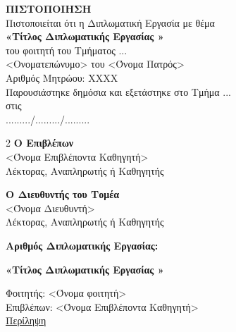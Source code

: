 \begin{center}
	\clearpage\thispagestyle{empty} %
    \vspace*{2cm}
    {\Large\textbf{ΠΙΣΤΟΠΟΙΗΣΗ}}\\[1cm]
    \large
    Πιστοποιείται ότι η Διπλωματική Εργασία με θέμα\\[1cm]
    \textbf{«Τίτλος Διπλωματικής Εργασίας »}\\[1cm]
	του φοιτητή του Τμήματος ...\\
	
	<Ονοματεπώνυμο> του <Όνομα Πατρός>\\[0.8cm]
	Αριθμός Μητρώου: ΧΧΧΧ\\[1.5cm]
	Παρουσιάστηκε δημόσια και εξετάστηκε στο Τμήμα ...\\
	στις\\
	........./........./.........\\[8cm]

	\raggedcolumns
	\begin{multicols}{2}
			\textbf{ Ο Επιβλέπων}\\[1cm]
			 	<Όνομα Επιβλέποντα Καθηγητή>\\
				Λέκτορας, Αναπληρωτής ή Καθηγητής
	\columnbreak

		\textbf{Ο Διευθυντής του Τομέα}\\[1cm]
			<Όνομα Διευθυντή>\\
			Λέκτορας, Αναπληρωτής ή Καθηγητής
	
	\end{multicols}
	\pagebreak\thispagestyle{empty}
\end{center}
\afterpage{\null\newpage}



\clearpage\thispagestyle{empty}
\large
{}
{}
\vspace*{1.5cm}
\hspace{0.2cm}\textbf{Αριθμός Διπλωματικής Εργασίας:}\\
\begin{center}
    \textbf{«Τίτλος Διπλωματικής Εργασίας »}\\[0.8cm]
\end{center}
Φοιτητής: <Όνομα φοιτητή>\\[0.8cm]
Επιβλέπων: <Όνομα Επιβλέποντα Καθηγητή>\\[0.8cm]
\underline{Περίληψη}\\


